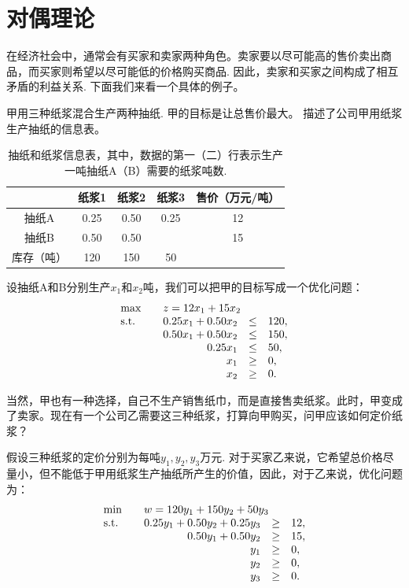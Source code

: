 \chapter{对偶理论}\label{chap:duality}

在经济社会中，通常会有买家和卖家两种角色。卖家要以尽可能高的售价卖出商品，而买家则希望以尽可能低的价格购买商品. 因此，卖家和买家之间构成了相互矛盾的利益关系. 下面我们来看一个具体的例子。

甲用三种纸浆混合生产两种抽纸. 甲的目标是让总售价最大。 描述了公司甲用纸浆生产抽纸的信息表。
\begin{table}[ht]
        \centering
        \begin{tabular}{c|ccc|c}
        \hline
            & 纸浆1&纸浆2&纸浆3&售价（万元/吨） \\
            \hline
             抽纸A  & 0.25&0.50&0.25&12 \\
             抽纸B  & 0.50&0.50& &15\\
             \hline
             库存（吨）&120&150&50& \\
             \hline
        \end{tabular}
        \caption{抽纸和纸浆信息表，其中，数据的第一（二）行表示生产一吨抽纸A（B）需要的纸浆吨数. }
        \label{tab:cleaner-intro}
\end{table}

设抽纸A和B分别生产$x_1$和$x_2$吨，我们可以把甲的目标写成一个优化问题：
\begin{align*}
\begin{array}{lrcl}
\max\quad&\multicolumn{3}{l}{z=12x_1+15x_2}\\
\text{s.t.}\quad&0.25x_1+0.50x_2&\le&120,\\
&0.50x_1+0.50x_2&\le&150,\\
&0.25x_1&\le& 50,\\
&x_1&\ge& 0,\\
&x_2&\ge& 0.
\end{array}
\end{align*}

当然，甲也有一种选择，自己不生产销售纸巾，而是直接售卖纸浆。此时，甲变成了卖家。现在有一个公司乙需要这三种纸浆，打算向甲购买，问甲应该如何定价纸浆？

假设三种纸浆的定价分别为每吨$y_1,y_2,y_3$万元. 对于买家乙来说，它希望总价格尽量小，但不能低于甲用纸浆生产抽纸所产生的价值，因此，对于乙来说，优化问题为：
\[
 \begin{array}{lrcl}
\min\quad&\multicolumn{3}{l}{w=120y_1+150y_2+50y_3} \\
\text{s.t.}\quad& 0.25y_1+0.50y_2+0.25y_3&\ge&12,\\
&0.50y_1+0.50y_2&\ge&15,\\
&y_1&\ge&0,\\
&y_2&\ge&0,\\
&y_3&\ge&0.
 \end{array}
\]

